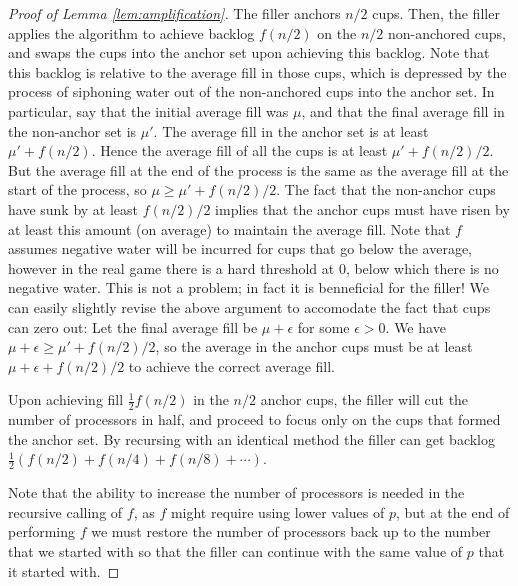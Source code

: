 \documentclass{article}[11pt]
\begin{document}
\begin{proof}[Proof of Lemma \ref{lem:amplification}]
  The filler anchors $n/2$ cups. Then, the filler applies the algorithm to
  achieve backlog $f(n/2)$ on the $n/2$ non-anchored cups, and swaps the cups
  into the anchor set upon achieving this backlog. Note that this backlog is
  relative to the average fill in those cups, which is depressed by the process
  of siphoning water out of the non-anchored cups into the anchor set. In
  particular, say that the initial average fill was $\mu$, and that the final
  average fill in the non-anchor set is $\mu'$. The average fill in the anchor
  set is at least $\mu' + f(n/2)$. Hence the average fill of all the cups is at
  least $\mu' + f(n/2)/2$. But the average fill at the end of the process is
  the same as the average fill at the start of the process, so $\mu \ge \mu' +
  f(n/2)/2$. The fact that the non-anchor cups have sunk by at least $f(n/2)/2$
  implies that the anchor cups must have risen by at least this amount (on
  average) to maintain the average fill. Note that $f$ assumes negative water
  will be incurred for cups that go below the average, however in the real game
  there is a hard threshold at $0$, below which there is no negative water.
  This is not a problem; in fact it is benneficial for the filler! We can
  easily slightly revise the above argument to accomodate the fact that cups
  can zero out: Let the final average fill be $\mu+\epsilon$ for some
  $\epsilon>0$. We have $\mu+\epsilon \ge \mu' + f(n/2)/2$, so the average in the
  anchor cups must be at least $\mu+\epsilon+f(n/2)/2$ to achieve the correct
  average fill.
  
  Upon achieving fill $\frac{1}{2}f(n/2)$ in the $n/2$ anchor cups, the filler
  will cut the number of processors in half, and proceed to focus only on the
  cups that formed the anchor set. By recursing with an identical method the
  filler can get backlog $\frac{1}{2}(f(n/2) + f(n/4) + f(n/8) + \cdots)$.

  Note that the ability to increase the number of processors is needed in the
  recursive calling of $f$, as $f$ might require using lower values of $p$, but
  at the end of performing $f$ we must restore the number of processors back up
  to the number that we started with so that the filler can continue with the
  same value of $p$ that it started with.


\end{proof}
\end{document}
